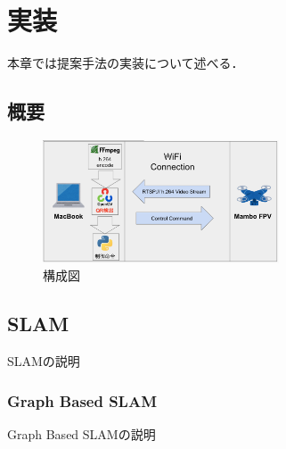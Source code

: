 \chapter{実装}
\label{implementation}

本章では提案手法の実装について述べる．

\section{概要}
\begin{figure}[htbp]
  \begin{center}
    \includegraphics[clip,width=7.0cm]{img/sys-struct.png}
    \caption{構成図}
    \label{fig:struct}
  \end{center}
\end{figure}

\section{SLAM}
\label{slam}

SLAMの説明

\subsection{Graph Based SLAM}

Graph Based SLAMの説明



